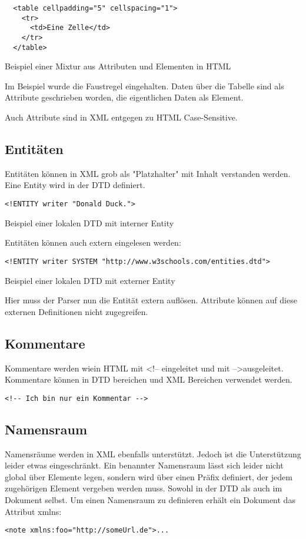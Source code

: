 \begin{listing}[H]
\begin{verbatim}
  <table cellpadding="5" cellspacing="1">
    <tr>
      <td>Eine Zelle</td>
    </tr>
  </table>
\end{verbatim}
\caption{Beispiel einer Mixtur aus Attributen und Elementen in HTML}
\end{listing}

Im Beispiel wurde die Faustregel eingehalten. Daten über die Tabelle sind als Attribute geschrieben worden, die
eigentlichen Daten als Element.

Auch Attribute sind in XML entgegen zu HTML Case-Sensitive.

\subsection{Entitäten}\label{XML:Entities}
Entitäten können in XML grob als "Platzhalter" mit Inhalt verstanden werden. Eine Entity wird in der DTD definiert.
\begin{listing}[H]
\begin{verbatim}
<!ENTITY writer "Donald Duck.">
\end{verbatim}
\caption{Beispiel einer lokalen DTD mit interner Entity}
\end{listing}

Entitäten können auch extern eingelesen werden:
\begin{listing}[H]
\begin{verbatim}
<!ENTITY writer SYSTEM "http://www.w3schools.com/entities.dtd">
\end{verbatim}
\caption{Beispiel einer lokalen DTD mit externer Entity}
\end{listing}

Hier muss der Parser nun die Entität extern auflösen. Attribute können auf diese externen Definitionen nicht
zugegreifen.

\subsection{Kommentare}
Kommentare werden wiein HTML mit \textless!-- eingeleitet und mit --\textgreater ausgeleitet. Kommentare können in DTD bereichen und XML
Bereichen verwendet werden.
\begin{verbatim}
<!-- Ich bin nur ein Kommentar -->
\end{verbatim}

\subsection{Namensraum}
Namensräume werden in XML ebenfalls unterstützt. Jedoch ist die Unterstützung leider etwas eingeschränkt.
Ein benannter Namensraum lässt sich leider nicht global über Elemente legen, sondern wird über einen Präfix definiert, der jedem
zugehörigen Element vergeben werden muss. Sowohl in der DTD als auch im Dokument selbst.
Um einen Namensraum zu definieren erhält ein Dokument das Attribut xmlns:
\begin{verbatim}
<note xmlns:foo="http://someUrl.de">...
\end{verbatim}

